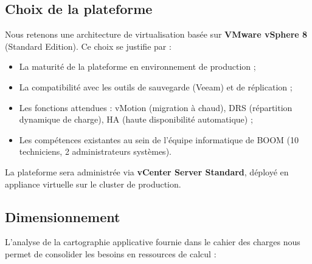 \documentclass[12pt,a4paper]{report}
\begin{document}
\subsection{Choix de la plateforme}

Nous retenons une architecture de virtualisation basée sur \textbf{VMware vSphere 8} (Standard Edition). Ce choix se justifie par :

\begin{itemize}
\item La maturité de la plateforme en environnement de production ;
\item La compatibilité avec les outils de sauvegarde (Veeam) et de réplication ;
\item Les fonctions attendues : vMotion (migration à chaud), DRS (répartition dynamique de charge), HA (haute disponibilité automatique) ;
\item Les compétences existantes au sein de l'équipe informatique de BOOM (10 techniciens, 2 administrateurs systèmes).
\end{itemize}

La plateforme sera administrée via \textbf{vCenter Server Standard}, déployé en appliance virtuelle sur le cluster de production.

\subsection{Dimensionnement}

L'analyse de la cartographie applicative fournie dans le cahier des charges nous permet de consolider les besoins en ressources de calcul :
\end{document}
